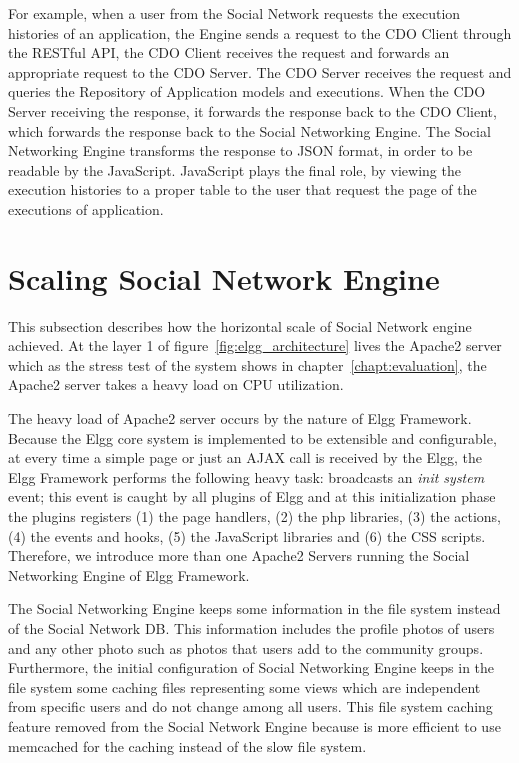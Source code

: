 For example, when a user from the Social Network requests the execution histories of an application, the Engine sends a request to the CDO Client through the RESTful API, the CDO Client receives the request and forwards an appropriate request to the CDO Server. The CDO Server receives the request and queries the Repository of Application models and executions. When the CDO Server receiving the response, it forwards the response back to the CDO Client, which forwards the response back to the Social Networking Engine. The Social Networking Engine transforms the response to JSON format, in order to be readable by the JavaScript. JavaScript plays the final role, by viewing the execution histories to a proper table to the user that request the page of the executions of application.

\section{Scaling Social Network Engine}
\label{sec:engine_scale}

This subsection describes how the horizontal scale of Social Network engine achieved. At the layer 1 of figure~\ref{fig:elgg_architecture} lives the Apache2 server which as the stress test of the system shows in chapter~\ref{chapt:evaluation}, the Apache2 server takes a heavy load on CPU utilization. 

The heavy load of Apache2 server occurs by the nature of Elgg Framework. Because the Elgg core system is implemented to be extensible and configurable, at every time a simple page or just an AJAX call is received by the Elgg, the Elgg Framework performs the following heavy task: broadcasts an {\it init system} event; this event is caught by all plugins of Elgg and at this initialization phase the plugins registers (1) the page handlers, (2) the php libraries, (3) the actions, (4) the events and hooks, (5) the JavaScript libraries and (6) the CSS scripts. Therefore, we introduce more than one Apache2 Servers running the Social Networking Engine of Elgg Framework.  

The Social Networking Engine keeps some information in the file system instead of the Social Network DB. This information includes the profile photos of users and any other photo such as photos that users add to the community groups. Furthermore, the initial configuration of Social Networking Engine keeps in the file system some caching files representing some views which are independent from specific users and do not change among all users. This file system caching feature removed from the Social Network Engine because is more efficient to use memcached for the caching instead of the slow file system.

